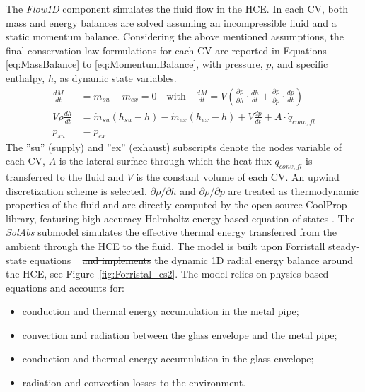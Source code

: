 \documentclass[final,3p,times,review]{elsarticle}
\providecommand{\DIFadd}[1]{{\protect\color{blue}\uwave{#1}}} %
\providecommand{\DIFdel}[1]{{\protect\color{red}\sout{#1}}}                      %
\providecommand{\DIFaddbegin}{} %
\providecommand{\DIFaddend}{} %
\providecommand{\DIFdelbegin}{} %
\providecommand{\DIFdelend}{} %
\begin{document}
The \textit{Flow1D} component simulates the fluid flow in the HCE. In each CV, both mass and energy balances are solved assuming an incompressible fluid and a static momentum balance. Considering the above mentioned assumptions, the final conservation law formulations for each CV are reported in Equations \ref{eq:MassBalance} to \ref{eq:MomentumBalance}, with pressure, $p$, and specific enthalpy, $h$, as dynamic state variables.
%
\begin{align}
\label{eq:MassBalance}
\frac{dM}{dt} & = \dot{m}_{su}-\dot{m}_{ex} = 0  \quad \text{with} \quad
\frac{dM}{dt} = V \left( \frac{\partial \rho}{\partial h}  \cdot \frac{dh}{dt} + \frac{\partial \rho}{\partial p} \cdot \frac{dp}{dt} \right) \\
\label{eq:EnergyBalance}
V\rho \frac{dh}{dt} & = \dot{m}_{su}(h_{su} - h) - \dot{m}_{ex}(h_{ex} - h) + V \frac{dp}{dt} + A \cdot \dot{q}_{conv,fl} \\
\label{eq:MomentumBalance}
p_{su} & = p_{ex} 
\end{align}
%
The ''su'' (supply) and ''ex'' (exhaust) subscripts denote the nodes variable of each CV, $A$ is the lateral surface through which the heat flux $\dot{q}_{conv,fl}$ is transferred to the fluid and $V$ is the constant volume of each CV. An upwind discretization scheme is selected.
$\partial \rho / \partial h$ and $\partial \rho / \partial p$ are treated as  thermodynamic properties of the fluid and are directly computed by the open-source CoolProp library, featuring high accuracy Helmholtz energy-based equation of states \cite{Bell_CoolProp_2013}.
The \textit{SolAbs} submodel simulates the effective thermal energy transferred from the ambient through the HCE to the fluid. The model is built upon Forristall steady-state equations ~\cite{Forristall2003} \DIFdelbegin \DIFdel{and implements }\DIFdelend \DIFaddbegin \DIFadd{with }\DIFaddend the dynamic 1D radial energy balance around the HCE, see Figure~\ref{fig:Forristal_cs2}. The model relies on physics-based equations and accounts for:
%
 \begin{itemize} 
	\item conduction and thermal energy accumulation in the metal pipe;
	\item convection and radiation between the glass envelope and the metal pipe;
	\item conduction and thermal energy accumulation in the glass envelope;
	\item radiation and convection losses to the environment.
 \end{itemize} 
\end{document}
